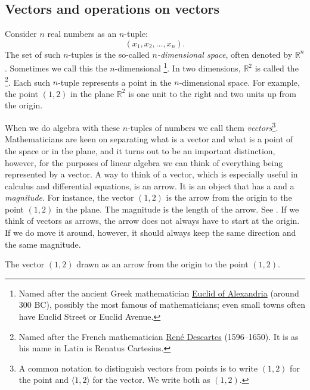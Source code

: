 \subsection{Vectors and operations on vectors}

Consider $n$ real numbers as an $n$-tuple:
\begin{equation*}
(x_1,x_2,\ldots,x_n).
\end{equation*}
The set of such $n$-tuples is the so-called
\emph{$n$-dimensional space},
often denoted by ${\mathbb R}^n$.
Sometimes we call this the $n$-dimensional
\emph{}%
\footnote{Named after the ancient Greek mathematician
\href{https://en.wikipedia.org/wiki/Euclid}{Euclid of Alexandria}
(around 300 BC), possibly the most famous of mathematicians; even
small towns often have Euclid Street or Euclid Avenue.}. 
In two dimensions, ${\mathbb R}^2$ is called the
\emph{}%
\footnote{Named after the French mathematician
\href{https://en.wikipedia.org/wiki/Descartes}{Ren\'e Descartes}
(1596--1650).  It is  as his name in Latin is Renatus
Cartesius.}.
Each such $n$-tuple represents a point in the $n$-dimensional space.
For example, the point
$(1,2)$ in the plane ${\mathbb R}^2$
is one unit to the right and two units up from the
origin.

When we do algebra with these $n$-tuples of numbers we call them
\emph{vectors}\footnote{%
A common notation to distinguish vectors from points is to write $(1,2)$
for the point and $\langle 1,2 \rangle$ for the vector.  We write both as
$(1,2)$.}.  Mathematicians are keen on separating
what is a vector and what is a point of the space or in the plane,
and it turns out
to be an important distinction, however, for the purposes of linear algebra
we can think of everything being represented by a vector.
A way to think of a vector, which is especially useful in calculus
and differential equations, is an arrow.  It is an object that has
a \emph{} and a \emph{magnitude}.
For instance, the vector $(1,2)$
is the arrow from the origin to the point $(1,2)$ in the plane.
The magnitude is the length of the arrow.
See .
If we think of vectors as arrows,
the arrow does not always have to start at the origin.  If we do move it
around, however, it should always keep the same direction and the same magnitude.

\begin{myfig}
\capstart
{}
\caption{The vector $(1,2)$ drawn as an arrow from the origin to the point
$(1,2)$.\label{linalg-vecarrow:fig}}
\end{myfig}

